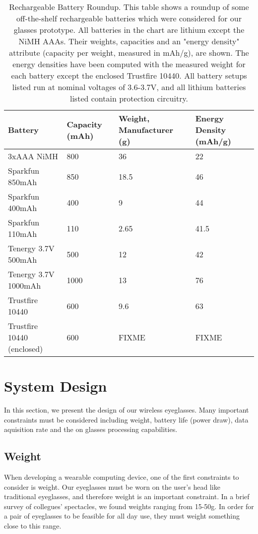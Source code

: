 \label{sec:design}
\begin{center}
\begin{table*}[t!]
   \centering
   \begin{tabular}{|l|l|l|l|}
      \hline
      \bf Battery & \bf Capacity (mAh) & \bf Weight, Manufacturer (g) & \bf Energy Density (mAh/g) \\
      \hline
      3xAAA NiMH & 800 & 36 & 22 \\
      \hline
      Sparkfun 850mAh & 850 & 18.5 & 46 \\
      \hline
      Sparkfun 400mAh & 400 & 9 & 44 \\
      \hline
      Sparkfun 110mAh & 110 & 2.65 & 41.5 \\
      \hline
      Tenergy 3.7V 500mAh & 500 & 12 & 42 \\
      \hline
      Tenergy 3.7V 1000mAh & 1000 & 13 & 76 \\
      \hline
      Trustfire 10440 & 600 & 9.6 & 63 \\
      \hline
      Trustfire 10440 (enclosed) & 600 & FIXME & FIXME \\
      \hline
   \end{tabular}
   \caption[b]{Rechargeable Battery Roundup.  This table shows a roundup of some off-the-shelf rechargeable batteries which were considered for our glasses prototype.  All batteries in the chart are lithium except the NiMH AAAs.  Their weights, capacities and an "energy density" attribute (capacity per weight, measured in mAh/g), are shown.  The energy densities have been computed with the measured weight for each battery except the enclosed Trustfire 10440.  All battery setups listed run at nominal voltages of 3.6-3.7V, and all lithium batteries listed contain protection circuitry.}
   \label{tab:batteries}
\end{table*}
\end{center}
\section{System Design}
In this section, we present the design of our wireless eyeglasses.  Many important constraints must be considered including weight, battery life (power draw), data aquisition rate and the on glasses processing capabilities. 
\subsection{Weight}
When developing a wearable computing device, one of the first constraints to consider is weight.  Our eyeglasses must be worn on the user's head like traditional eyeglasses, and therefore weight is an important constraint.  In a brief survey of collegues' spectacles, we found weights ranging from 15-50g.  In order for a pair of eyeglasses to be feasible for all day use, they must weight something close to this range.

